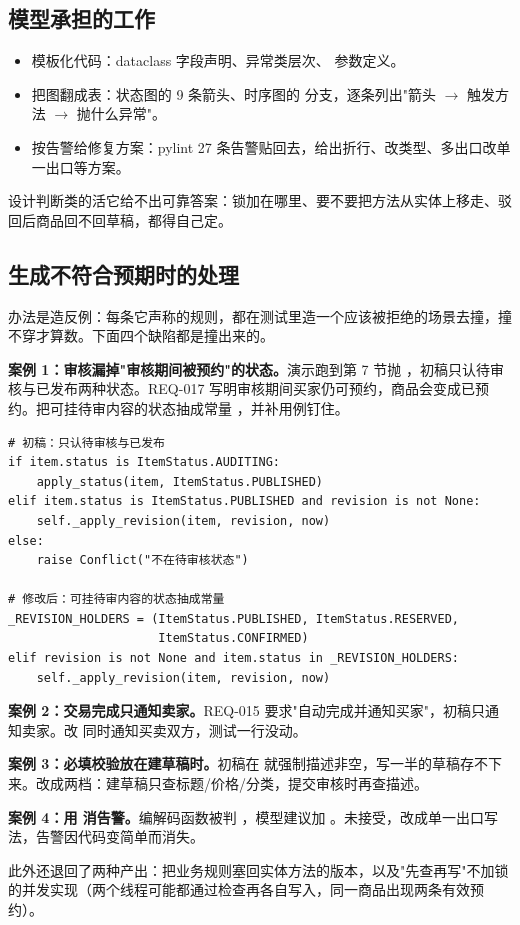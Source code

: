 \subsection{模型承担的工作}

\begin{itemize}[leftmargin=1.6em,itemsep=2pt,topsep=3pt]
\item 模板化代码：dataclass 字段声明、异常类层次、 参数定义。
\item 把图翻成表：状态图的 9 条箭头、时序图的  分支，逐条列出"箭头 $\to$ 触发方法 $\to$ 抛什么异常"。
\item 按告警给修复方案：pylint 27 条告警贴回去，给出折行、改类型、多出口改单一出口等方案。
\end{itemize}

设计判断类的活它给不出可靠答案：锁加在哪里、要不要把方法从实体上移走、驳回后商品回不回草稿，都得自己定。

\subsection{生成不符合预期时的处理}

办法是造反例：每条它声称的规则，都在测试里造一个应该被拒绝的场景去撞，撞不穿才算数。下面四个缺陷都是撞出来的。

\textbf{案例 1：审核漏掉"审核期间被预约"的状态。}演示跑到第 7 节抛 ，初稿只认待审核与已发布两种状态。REQ-017 写明审核期间买家仍可预约，商品会变成已预约。把可挂待审内容的状态抽成常量 ，并补用例钉住。

\begin{lstlisting}
# 初稿：只认待审核与已发布
if item.status is ItemStatus.AUDITING:
    apply_status(item, ItemStatus.PUBLISHED)
elif item.status is ItemStatus.PUBLISHED and revision is not None:
    self._apply_revision(item, revision, now)
else:
    raise Conflict("不在待审核状态")

# 修改后：可挂待审内容的状态抽成常量
_REVISION_HOLDERS = (ItemStatus.PUBLISHED, ItemStatus.RESERVED,
                     ItemStatus.CONFIRMED)
elif revision is not None and item.status in _REVISION_HOLDERS:
    self._apply_revision(item, revision, now)
\end{lstlisting}

\textbf{案例 2：交易完成只通知卖家。}REQ-015 要求"自动完成并通知买家"，初稿只通知卖家。改  同时通知买卖双方，测试一行没动。

\textbf{案例 3：必填校验放在建草稿时。}初稿在  就强制描述非空，写一半的草稿存不下来。改成两档：建草稿只查标题/价格/分类，提交审核时再查描述。

\textbf{案例 4：用  消告警。}编解码函数被判 ，模型建议加 。未接受，改成单一出口写法，告警因代码变简单而消失。

此外还退回了两种产出：把业务规则塞回实体方法的版本，以及"先查再写"不加锁的并发实现（两个线程可能都通过检查再各自写入，同一商品出现两条有效预约）。
